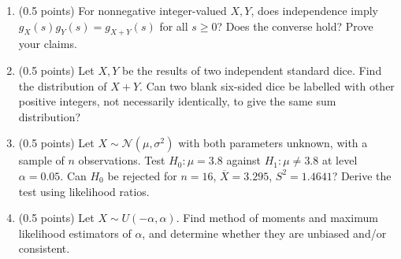 \documentclass[a4paper]{report}
\begin{document}
\begin{problem}
\begin{enumerate}
\item (0.5 points) For nonnegative integer-valued $X,Y$, does independence imply $g_X(s)g_Y(s)=g_{X+Y}(s)$ for all $s\geq0$? Does the converse hold? Prove your claims.
\item (0.5 points) Let $X,Y$ be the results of two independent standard dice. Find the distribution of $X+Y$. Can two blank six-sided dice be labelled with other positive integers, not necessarily identically, to give the same sum distribution?
\item (0.5 points) Let $X\sim\mathcal N(\mu,\sigma^2)$ with both parameters unknown, with a sample of $n$ observations. Test $H_0:\mu=3.8$ against $H_1:\mu\neq3.8$ at level $\alpha=0.05$. Can $H_0$ be rejected for $n=16$, $\overline X=3.295$, $S^2=1.4641$? Derive the test using likelihood ratios.
\item (0.5 points) Let $X\sim U(-\alpha,\alpha)$. Find method of moments and maximum likelihood estimators of $\alpha$, and determine whether they are unbiased and/or consistent.
\end{enumerate}
\end{problem}
\end{document}
